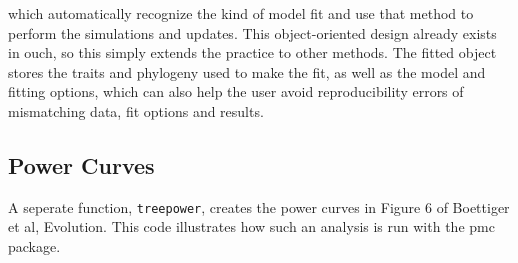 \documentclass{elsarticle}
\begin{document}
which automatically recognize the kind of model fit and use that method to perform the simulations and updates. This object-oriented design already exists in ouch, so this simply extends the practice to other methods.  The fitted object stores the traits and phylogeny used to make the fit, as well as the model and fitting options, which can also help the user avoid reproducibility errors of mismatching data, fit options and results.


\subsection{Power Curves}

A seperate function, \texttt{treepower}, creates the power curves in Figure 6 of Boettiger et al, Evolution. This code illustrates how such an analysis is run with the pmc package.   
\end{document}
